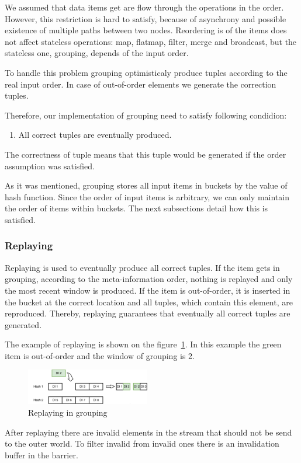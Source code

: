 \label {fs-collision}

We assumed that data items get are flow through the operations in the order. However, this restriction is hard to satisfy, because of asynchrony and possible existence of multiple paths between two nodes. Reordering is of the items does not affect stateless operations: map, flatmap, filter, merge and broadcast, but the stateless one, grouping, depends of the input order.

To handle this problem grouping optimisticaly produce tuples according to the real input order. In case of out-of-order elements we generate the correction tuples.

Therefore, our implementation of grouping need to satisfy following condidion: 

\begin{enumerate}
\item All correct tuples are eventually produced.
\end{enumerate}

The correctness of tuple means that this tuple would be generated if the order assumption was satisfied. 

As it was mentioned, grouping stores all input items in buckets by the value of hash function. Since the order of input items is arbitrary, we can only maintain the order of items within buckets. The next subsections detail how this is satisfied.

\subsubsection{Replaying}

Replaying is used to eventually produce all correct tuples. If the item gets in grouping, according to the meta-information order, nothing is replayed and only the most recent window is produced. If the item is out-of-order, it is inserted in the bucket at the correct location and all tuples, which contain this element, are reproduced. Thereby, replaying guarantees that eventually all correct tuples are generated.

The example of replaying is shown on the figure~\ref{grouping-replaying-figure}. In this example the green item is out-of-order and the window of grouping is 2.

\begin{figure}[htbp]
  \centering
  \includegraphics[width=0.48\textwidth]{pics/grouping-replaying}
  \caption{Replaying in grouping}
  \label {grouping-replaying-figure}
\end{figure}

After replaying there are invalid elements in the stream that should not be send to the outer world. To filter invalid from invalid ones there is an invalidation buffer in the barrier.
